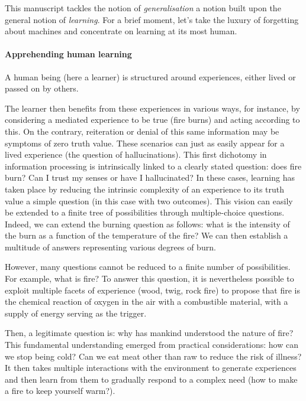 
This manuscript tackles the notion of \emph{generalisation} a notion built upon the general notion of \emph{learning}. For a brief moment, let's take the luxury of forgetting about machines and concentrate on learning at its most human. 

\paragraph{Apprehending human learning} A human being (here a learner) is structured around experiences, either lived or passed on by others. 

The learner then benefits from these experiences in various ways, for instance, by considering a mediated experience to be true (fire burns) and acting according to this. On the contrary, reiteration or denial of this same information may be symptoms of zero truth value. These scenarios can just as easily appear for a lived experience (the question of hallucinations). This first dichotomy in information processing is intrinsically linked to a clearly stated question: does fire burn? Can I trust my senses or have I hallucinated? In these cases, learning has taken place by reducing the intrinsic complexity of an experience to its truth value \wrt a simple question (in this case with two outcomes).  This vision can easily be extended to a finite tree of possibilities through multiple-choice questions. Indeed, we can extend the burning question as follows: what is the intensity of the burn as a function of the temperature of the fire? We can then establish a multitude of answers representing various degrees of burn. 

However, many questions cannot be reduced to a finite number of possibilities. For example, what is fire? To answer this question, it is nevertheless possible to exploit multiple facets of experience (wood, twig, rock fire) to propose that fire is the chemical reaction of oxygen in the air with a combustible material, with a supply of energy serving as the trigger. 

Then, a legitimate question is: why has mankind understood the nature of fire? This fundamental understanding emerged from practical considerations: how can we stop being cold? Can we eat meat other than raw to reduce the risk of illness? It then takes multiple interactions with the environment to generate experiences and then learn from them to gradually respond to a complex need (how to make a fire to keep yourself warm?).

